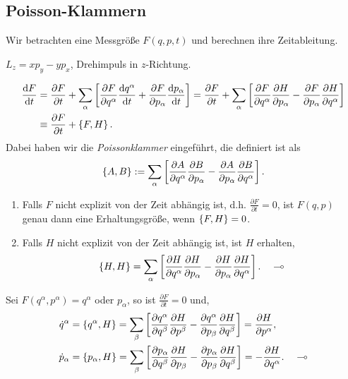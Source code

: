 \subsection{Poisson-Klammern}
Wir betrachten eine Messgröße $F(q,p,t)$ und berechnen ihre Zeitableitung.
\begin{bsp}
$L_z = xp_y - yp_x$, Drehimpuls in $z$-Richtung.\bsphere
\end{bsp}
\begin{align*}
\frac{\mathrm{d} F}{\,\mathrm{d} t\,} &= \frac{\partial F}{\partial t} + \sum_\alpha \left[
\frac{\partial F}{\partial q^\alpha}\frac{\mathrm{d} q^\alpha}{\,\mathrm{d} t\,} +
\frac{\partial F}{\partial p_\alpha} \frac{\mathrm{d} p_\alpha}{\,\mathrm{d} t\,}
\right] =
\frac{\partial F}{\partial t} + \sum_\alpha \left[
\frac{\partial F}{\partial q^\alpha}\frac{\partial H}{\partial p_\alpha} -
\frac{\partial F}{\partial p_\alpha} \frac{\partial H}{\partial q^\alpha}
\right]\\
&\equiv \frac{\partial F}{\partial t} + \left\{ F,H \right\}.
\end{align*}
Dabei haben wir die \emph{Poissonklammer} eingeführt, die definiert ist als
\begin{align*}
\left\{ A,B \right\} := \sum_\alpha \left[
\frac{\partial A}{\partial q^\alpha}\frac{\partial B}{\partial p_\alpha} -
\frac{\partial A}{\partial p_\alpha} \frac{\partial B}{\partial q^\alpha}
\right].
\end{align*}
\begin{bemn}[Bemerkungen.]
\begin{enumerate}[label=\arabic{*}.)]
  \item 
Falls $F$ nicht explizit von der Zeit abhängig ist, d.h. $\frac{\partial
F}{\partial t} = 0$, ist $F(q,p)$ genau dann eine Erhaltungsgröße, wenn
$\left\{ F,H \right\} = 0$.
\item
Falls $H$ nicht explizit von der Zeit abhängig ist, ist $H$ erhalten,
\begin{align*}
\left\{ H,H \right\} = \sum_\alpha \left[
\frac{\partial H}{\partial q^\alpha}\frac{\partial H}{\partial p_\alpha} -
\frac{\partial H}{\partial p_\alpha} \frac{\partial H}{\partial q^\alpha}
\right].\quad\multimap
\end{align*}
\end{enumerate}
\end{bemn}

\begin{bemn}[Spezialfälle.]
Sei $F(q^\alpha,p^\alpha)=q^\alpha$ oder $p_\alpha$, so ist $\frac{\partial
F}{\partial t} = 0$ und,
\begin{align*}
\dot{q}^\alpha &= \left\{ q^\alpha,H \right\} = \sum\limits_\beta \left[ \frac{\partial
q^\alpha}{\partial q^\beta}\frac{\partial H}{\partial p^\beta} - \frac{\partial
q^\alpha}{\partial p_\beta}\frac{\partial H}{\partial q^\beta} \right]
= \frac{\partial H}{\partial p^\alpha},\\
\dot{p}_\alpha &= \left\{ p_\alpha, H \right\} = \sum_\beta \left[ 
\frac{\partial p_\alpha}{\partial q^\beta}\frac{\partial H}{\partial p_\beta} -
\frac{\partial p_\alpha}{\partial p_\beta}\frac{\partial H}{\partial q^\beta}
\right]
= -\frac{\partial H}{\partial q^\alpha}.\quad\multimap
\end{align*}
\end{bemn}

